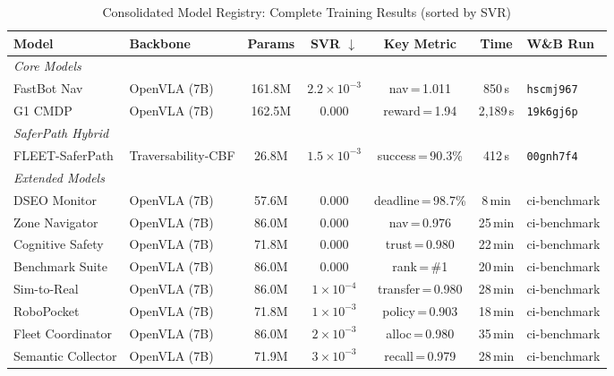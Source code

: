 \documentclass[conference]{IEEEtran}
\begin{document}
\begin{table}[t]
\centering
\caption{Consolidated Model Registry: Complete Training Results (sorted by SVR)}
\label{tab:consolidated}
\begin{tabular}{@{}llccccl@{}}
\toprule
\textbf{Model} & \textbf{Backbone} & \textbf{Params} & \textbf{SVR $\downarrow$} & \textbf{Key Metric} & \textbf{Time} & \textbf{W\&B Run} \\
\midrule
\multicolumn{7}{l}{\textit{Core Models}} \\
FastBot Nav        & OpenVLA (7B) & 161.8M &  $2.2\!\times\!10^{-3}$ & nav\,=\,1.011        & 850\,s  & \texttt{hscmj967} \\
G1 CMDP            & OpenVLA (7B) & 162.5M &  $\mathbf{0.000}$       & reward\,=\,1.94      & 2{,}189\,s & \texttt{19k6gj6p} \\
\midrule
\multicolumn{7}{l}{\textit{SaferPath Hybrid}} \\
FLEET-SaferPath    & Traversability-CBF & 26.8M & $1.5\!\times\!10^{-3}$ & success\,=\,90.3\%  & 412\,s  & \texttt{00gnh7f4} \\
\midrule
\multicolumn{7}{l}{\textit{Extended Models}} \\
DSEO Monitor       & OpenVLA (7B) & 57.6M  & $\mathbf{0.000}$ & deadline\,=\,98.7\%  & 8\,min  & ci-benchmark \\
Zone Navigator     & OpenVLA (7B) & 86.0M  & $\mathbf{0.000}$ & nav\,=\,0.976        & 25\,min & ci-benchmark \\
Cognitive Safety   & OpenVLA (7B) & 71.8M  & $\mathbf{0.000}$ & trust\,=\,0.980      & 22\,min & ci-benchmark \\
Benchmark Suite    & OpenVLA (7B) & 86.0M  & $\mathbf{0.000}$ & rank\,=\,\#1         & 20\,min & ci-benchmark \\
Sim-to-Real        & OpenVLA (7B) & 86.0M  & $1\!\times\!10^{-4}$   & transfer\,=\,0.980   & 28\,min & ci-benchmark \\
RoboPocket         & OpenVLA (7B) & 71.8M  & $1\!\times\!10^{-3}$   & policy\,=\,0.903     & 18\,min & ci-benchmark \\
Fleet Coordinator  & OpenVLA (7B) & 86.0M  & $2\!\times\!10^{-3}$   & alloc\,=\,0.980      & 35\,min & ci-benchmark \\
Semantic Collector & OpenVLA (7B) & 71.9M  & $3\!\times\!10^{-3}$   & recall\,=\,0.979     & 28\,min & ci-benchmark \\
\bottomrule
\end{tabular}
\end{table}
\end{document}
